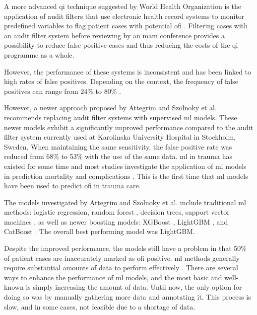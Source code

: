 \documentclass[12pt, letterpaper]{article}
\begin{document}
A more advanced \acrshort{qi} technique suggested by World Health Organization is the application of audit filters that use electronic health record systems to monitor predefined variables to flag patient cases with potential \acrfull{ofi} \cite{world_health_organization_guidelines_2009}. Filtering cases with an audit filter system before reviewing by an \acrshort{mam} conference provides a possibility to reduce false positive cases and thus reducing the costs of the \acrshort{qi} programme as a whole.

However, the performance of these systems is inconsistent and has been linked to high rates of false positives. Depending on the context, the frequency of false positives can range from 24\% to 80\% \cite{attergrim_predicting_2023,sanddal_analysis_2011,roy_learning_2017,ghorbani_analysis_2018}.

However, a newer approach proposed by Attegrim and Szolnoky et al. \cite{attergrim_predicting_2023} recommends replacing audit filter systems with supervised \acrfull{ml} models. These newer models exhibit a significantly improved performance compared to the audit filter system currently used at Karolinska University Hospital in Stockholm, Sweden. When maintaining the same sensitivity, the false positive rate was reduced from 68\% to 53\% with the use of the same data. \acrshort{ml} in trauma has existed for some time and most studies investigate the application of \acrshort{ml} models in prediction mortality and complications \cite{zhang_machine_2022}. This is the first time that \acrshort{ml} models have been used to predict \acrshort{ofi} in trauma care.

The models investigated by Attegrim and Szolnoky et al. include traditional \acrshort{ml} methods: logistic regression, random forest \cite{breiman_random_2001}, decision trees, support vector machines \cite{cortes_support-vector_1995}, as well as newer boosting models: XGBoost \cite{chen_xgboost_2016}, LightGBM \cite{ke_lightgbm_2017}, and CatBoost \cite{prokhorenkova_catboost_2018}. The overall best performing model was LightGBM.

Despite the improved performance, the models still have a problem in that 50\% of patient cases are inaccurately marked as \acrshort{ofi} positive. \acrshort{ml} methods generally require substantial amounts of data to perform effectively \cite{piccialli_survey_2021}. There are several ways to enhance the performance of \acrshort{ml} models, and the most basic and well-known is simply increasing the amount of data. Until now, the only option for doing so was by manually gathering more data and annotating it. This process is slow, and in some cases, not feasible due to a shortage of data.
\end{document}
